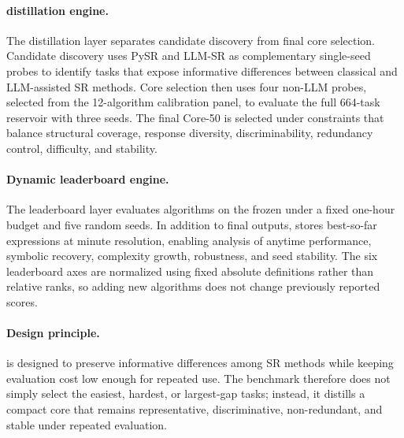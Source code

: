 \paragraph{\core{} distillation engine.}
The distillation layer separates candidate discovery from final core selection. Candidate discovery uses PySR and LLM-SR as complementary single-seed probes to identify tasks that expose informative differences between classical and LLM-assisted SR methods. Core selection then uses four non-LLM probes, selected from the 12-algorithm calibration panel, to evaluate the full 664-task reservoir with three seeds. The final Core-50 is selected under constraints that balance structural coverage, response diversity, discriminability, redundancy control, difficulty, and stability.

\paragraph{Dynamic leaderboard engine.}
The leaderboard layer evaluates algorithms on the frozen \core{} under a fixed one-hour budget and five random seeds. In addition to final outputs, \arena{} stores best-so-far expressions at minute resolution, enabling analysis of anytime performance, symbolic recovery, complexity growth, robustness, and seed stability. The six leaderboard axes are normalized using fixed absolute definitions rather than relative ranks, so adding new algorithms does not change previously reported scores.

\paragraph{Design principle.}
\arena{} is designed to preserve informative differences among SR methods while keeping evaluation cost low enough for repeated use. The benchmark therefore does not simply select the easiest, hardest, or largest-gap tasks; instead, it distills a compact core that remains representative, discriminative, non-redundant, and stable under repeated evaluation.
